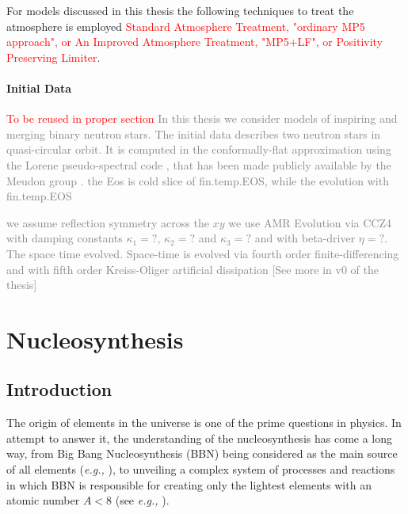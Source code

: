 \documentclass[11pt,a4paper,headinclude=true,DIV=14,BCOR=8mm,chapterprefix,listof=totoc,twoside,openright,abstracton]{scrbook}
\newcommand{\red}[1]{\textcolor{red}{#1}}
\newcommand{\gray}[1]{\textcolor{gray}{#1}}
\begin{document}
For models discussed in this thesis the following techniques to treat the atmosphere is employed \red{Standard Atmosphere Treatment, "ordinary MP5 approach", or An Improved Atmosphere Treatment, "MP5+LF", or Positivity Preserving Limiter}.


\subsubsection{Initial Data}
\red{To be reused in proper section}
\gray{In this thesis we consider models of inspiring and merging binary neutron stars. The initial data describes two neutron stars in quasi-circular orbit. It is computed in the conformally-flat approximation using the Lorene pseudo-spectral code \cite{Gourgoulhon:2000nn}, that has been made publicly available by the Meudon group \cite{Lorene}. \gray{the Eos is cold slice of fin.temp.EOS, while the evolution with fin.temp.EOS}
}

\gray{we assume reflection symmetry across the $xy$}
\gray{we use AMR}
\gray{Evolution via CCZ4 with damping constants $\kappa_1=?$, $\kappa_2=?$ and $\kappa_3=?$ and with beta-driver $\eta=?$. The space time evolved. Space-time is evolved via fourth order finite-differencing and with fifth order Kreiss-Oliger artificial dissipation} 
\gray{[See more in v0 of the thesis]}



\chapter{Nucleosynthesis}

\section{Introduction}

The origin of elements in the universe is one of the prime questions in physics. In attempt to answer it, the understanding of the nucleosynthesis has come a long way, from Big Bang Nucleosynthesis (BBN) being considered as the main source of all elements (\textit{e.g.,} \cite{Alpher:1948}), to unveiling a complex system of processes and reactions in which BBN is responsible for creating only the lightest elements with an atomic number $A<8$ (see \textit{e.g.,} \cite{Alpher:1950,Burbidge:1957,Shaviv:2012}). 
\end{document}
